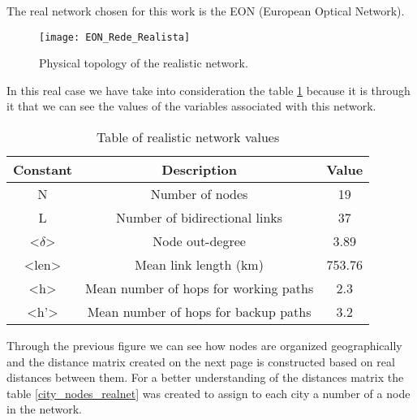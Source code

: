 The real network chosen for this work is the EON (European Optical Network).

\begin{figure}[h!]
\centering
\texttt{[image: EON\_Rede\_Realista]}
\caption{Physical topology of the realistic network.}
\end{figure}

In this real case we have take into consideration the table \ref{table_real_net} because it is through it that we can see the values of the variables associated with this network.

\begin{table}[h!]
\centering
\begin{tabular}{|| c | c | c||}
 \hline
 Constant & Description & Value \\
 \hline\hline
 N & Number of nodes & 19 \\
 L & Number of bidirectional links & 37 \\
 <$\delta$> & Node out-degree & 3.89 \\
 <len> & Mean link length (km) & 753.76 \\
 <h> & Mean number of hops for working paths & 2.3 \\
 <h'> & Mean number of hops for backup paths & 3.2 \\
 \hline
\end{tabular}
\caption{Table of realistic network values}
\label{table_real_net}
\end{table}

\newpage
Through the previous figure we can see how nodes are organized geographically and the distance matrix created on the next page is constructed based on real distances between them.
For a better understanding of the distances matrix the table \ref{city_nodes_realnet} was created to assign to each city a number of a node in the network.



